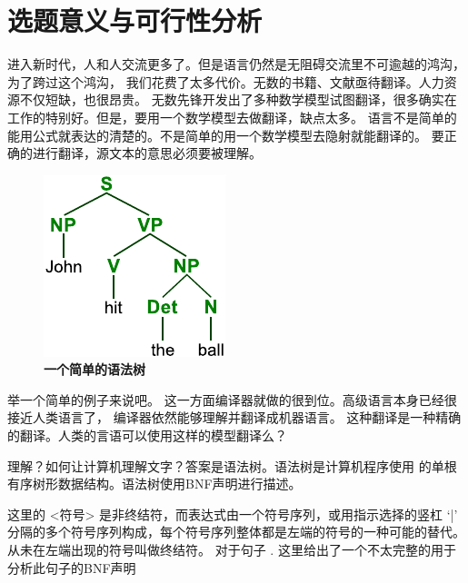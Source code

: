 
\section{选题意义与可行性分析}

进入新时代，人和人交流更多了。但是语言仍然是无阻碍交流里不可逾越的鸿沟，为了跨过这个鸿沟，
我们花费了太多代价。无数的书籍、文献亟待翻译。人力资源不仅短缺，也很昂贵。
无数先锋开发出了多种数学模型试图翻译，很多确实在工作的特别好。但是，要用一个数学模型去做翻译，缺点太多。
语言不是简单的能用公式就表达的清楚的。不是简单的用一个数学模型去隐射就能翻译的。
要正确的进行翻译，源文本的意思必须要被理解。

\begin{figure}%
\begin{center}%
\includegraphics{../ParseTree}%
\\\textbf{一个简单的语法树}%
\end{center}%
\end{figure}%
举一个简单的例子来说吧。
这一方面编译器就做的很到位。高级语言本身已经很接近人类语言了，
编译器依然能够理解并翻译成机器语言。
这种翻译是一种精确的翻译。人类的言语可以使用这样的模型翻译么？

\nocite{Compilers_Principles_Techniques_and_Tools}


理解？如何让计算机理解文字？答案是语法树\cite{cst}。语法树是计算机程序使用
的单根有序树形数据结构。语法树使用BNF\cite{BNF}声明进行描述。

\framedparbox{
\vspace*{2ex}
 <symbol> ::= \_\_expression\_\_ 
\vspace*{2ex}
 }
 
 这里的 <符号> 是非终结符，而表达式由一个符号序列，或用指示选择的竖杠 `|' 分隔的多个符号序列构成，每个符号序列整体都是左端的符号的一种可能的替代。从未在左端出现的符号叫做终结符。 
 对于句子 . 这里给出了一个不太完整的用于分析此句子的BNF声明 \\

